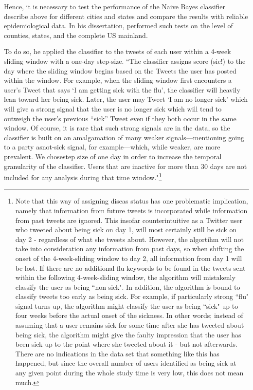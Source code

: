 \documentclass[11pt, a4paper,twoside]{report}\usepackage[]{graphicx}\usepackage[]{color}
\begin{document}
Hence, it is necessary to test the performance of the Naive Bayes classifier describe above for different cities and states and compare the results with reliable epidemiological data. In his dissertation, \cite{bodnar_data_2015} performed such tests on the level of counties, states, and the complete US mainland.\newline

To do so, he applied the classifier to the tweets of each user within a 4-week sliding window with a one-day step-size. ``The classifier assigns score (sic!) to the day where the sliding window begins based on the Tweets the user has posted within the window. For example, when the sliding window first encounters a user’s Tweet that says `I am getting sick with the flu', the classifier will heavily lean toward her being sick. Later, the user may Tweet `I am no longer sick' which will give a strong signal that the user is no longer sick which will tend to outweigh the user’s previous “sick” Tweet even if they both occur in the same window. Of course, it is rare that such strong signals are in the data, so the classifier is built on an amalgamation of many weaker signals—mentioning going to a party asnot-sick signal, for example—which, while weaker, are more prevalent. We chosestep size of one day in order to increase the temporal granularity of the classifier. Users that are inactive for more than 30 days are not included for any analysis during that time window."\footnote{Note that this way of assigning diseas status has one problematic implication, namely that information from future tweets is incorporated while information from past tweets are ignored. This insofar counterintuitive as a Twitter user who tweeted about being sick on day 1, will most certainly still be sick on day 2 - regardless of what she tweets about. However, the algortihm will not take into consideration any information from past days, so when shifting the onset of the 4-week-sliding window to day 2, all information from day 1 will be lost. If there are no additional flu keywords to be found in the tweets sent within the following 4-week-sliding window, the algorithm will mistakenly classify the user as being ``non sick". 
In addition, the algorithm is bound to classify tweets too early as being sick. For example, if particularly strong ``flu" signal turns up, the algorithm might classify the user as being ``sick" up to four weeks before the actual onset of the sickness. In other words; instead of assuming that a user remains sick for some time after she has tweeted about being sick, the algorithm might give the faulty impression that the user has been sick up to the point where she tweeted about it - but not afterwards.
There are no indications in the data set that something like this has happened, but since the overall number of users identified as being sick at any given point during the whole study time is very low, this does not mean much.}\newline
\end{document}
